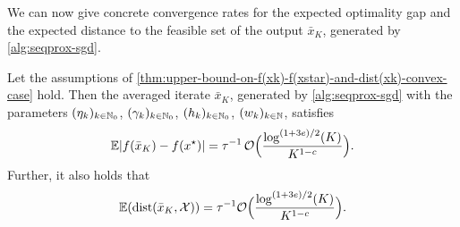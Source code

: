 We can now give concrete convergence rates for the expected optimality gap and the expected distance to the feasible set
of the output $\bar{x}_K$, generated by \cref{alg:seqprox-sgd}.
\begin{corollary}
    \label{cor:convergence-rates-in-expectation-convex-case}
    Let the assumptions of \cref{thm:upper-bound-on-f(xk)-f(xstar)-and-dist(xk)-convex-case} hold.
    Then the averaged iterate $\bar{x}_K$,
    generated by \cref{alg:seqprox-sgd} with the parameters $(\eta_k)_{k\in\mathbb{N}_{0}}$,
    $(\gamma_k)_{k\in\mathbb{N}_0}$, $(h_k)_{k\in\mathbb{N}_0}$, $(w_k)_{k\in\mathbb{N}}$, satisfies
    \[
        \mathbb{E}| f(\bar{x}_{K}) - f(x^\star) |
        = \tau^{-1} \, \mathcal{O}\Big( \frac{\log^{(1 + 3e) / 2} (K)}{K^{1-c}} \Big).
    \]
    Further, it also holds that
    \[
        \mathbb{E}(\operatorname{dist}(\bar{x}_K, \mathcal{X}))
        = \tau^{-1} \mathcal{O}\Big( \frac{\log^{(1 + 3e) / 2} (K)}{K^{1-c}} \Big).
    \]
\end{corollary}
